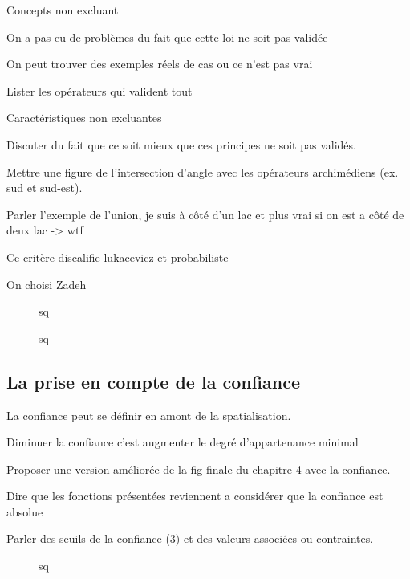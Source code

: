 Concepts non excluant

On a pas eu de problèmes du fait que cette loi ne soit pas validée

On peut trouver des exemples réels de cas ou ce n'est pas vrai

Lister les opérateurs qui valident tout

Caractéristiques non excluantes

Discuter du fait que ce soit mieux que ces principes ne soit pas
validés.


Mettre une figure de l'intersection d'angle avec les opérateurs
archimédiens (ex. sud et sud-est).

Parler l'exemple de l'union, je suis à côté d'un lac et plus vrai si
on est a côté de deux lac -> wtf

Ce critère discalifie lukacevicz et probabiliste


On choisi Zadeh

\begin{figure}
  \centering
  
  \caption{sq}
\end{figure}

\begin{figure}
  \centering
  
  \caption{sq}
\end{figure}



\subsection{La prise en compte de la confiance}

La confiance peut se définir en amont de la spatialisation.

Diminuer la confiance c'est augmenter le degré d'appartenance minimal

Proposer une version améliorée de la fig finale du chapitre 4 avec la
confiance.

Dire que les fonctions présentées reviennent a considérer que la
confiance est absolue

Parler des seuils de la confiance (3) et des valeurs associées ou
contraintes.


\begin{figure}
  \centering
  
  \caption{sq}
  \label{fig:qs}
\end{figure}





